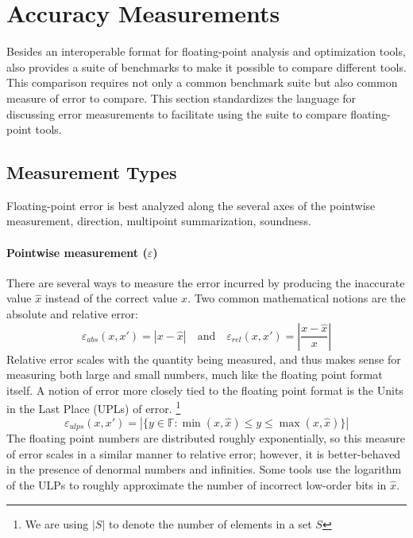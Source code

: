 \documentclass[main.tex]{subfiles}
\begin{document}
\section{Accuracy Measurements}
\label{sec:measure}

Besides an interoperable format
  for floating-point analysis and optimization tools,
  \name also provides a suite of benchmarks
  to make it possible to compare different tools.
This comparison requires not only a common benchmark suite
  but also common measure of error to compare.
This section standardizes the language
  for discussing error measurements
  to facilitate using the \name suite to compare floating-point tools.

\subsection{Measurement Types}

Floating-point error is best analyzed along the several axes
  of the pointwise measurement, direction,
  multipoint summarization, soundness.

\paragraph{Pointwise measurement ($\varepsilon$)}

There are several ways to measure the error incurred
  by producing the inaccurate value $\hat x$ instead of the correct value $x$.
Two common mathematical notions are the absolute and relative error:
\begin{equation*}
  \varepsilon_{abs}(x, x') = \left|x - \hat x\right|
  \quad \text{and} \quad
  \varepsilon_{rel}(x, x') = \left|\frac{x - \hat x}{x}\right|
\end{equation*}
Relative error scales with the quantity being measured,
  and thus makes sense for measuring both large and small numbers,
  much like the floating point format itself.
A notion of error more closely tied to the floating point format
  is the Units in the Last Place (UPLs) of error.%
\footnote{We are using $|S|$ to denote the number of elements in a set $S$}
\[
\varepsilon_{ulps}(x, x') = |\{ y \in \mathbb{F} : \min(x, \hat x) \le y \le \max(x, \hat x)
\}|
\]
The floating point numbers are distributed roughly exponentially, so
this measure of error scales in a similar manner to relative
error; however, it is better-behaved in the presence of denormal
numbers and infinities.
Some tools use the logarithm of the ULPs to roughly approximate
the number of incorrect low-order bits in $\hat x$.
\end{document}
